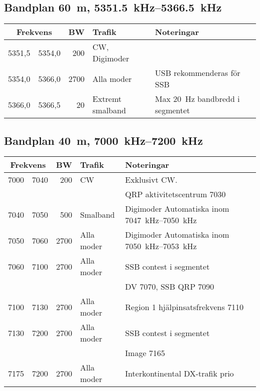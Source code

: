 \subsection{Bandplan \qty{60}{\metre}, \SIrange{5351,5}{5366,5}{\kilo\hertz}}
\begin{tabular}{rrrll}
    \multicolumn{2}{c}{\textbf{Frekvens}} & \textbf{BW} & \textbf{Trafik} & \textbf{Noteringar} \\ \hline

    5351,5 & 5354,0 & 200 & CW, Digimoder & \\ \hline
    5354,0 & 5366,0 & 2700 & Alla moder & USB rekommenderas för SSB  \\ \hline
    5366,0 & 5366,5 & 20 & Extremt smalband & Max \qty{20}{\hertz} bandbredd i segmentet \\
\end{tabular}

\subsection{Bandplan \qty{40}{\metre}, \SIrange{7000}{7200}{\kilo\hertz}}
\begin{tabular}{rrrll}
\multicolumn{2}{c}{\textbf{Frekvens}} & \textbf{BW} & \textbf{Trafik} & \textbf{Noteringar} \\ \hline

7000 & 7040 & 200  & CW         & Exklusivt CW.                                        \\
     &      &      &            & QRP aktivitetscentrum \num{7030}                    \\ \hline
7040 & 7050 & 500  & Smalband   & Digimoder Automatiska inom \SIrange{7047}{7050}{\kilo\hertz} \\ \hline
7050 & 7060 & 2700 & Alla moder & Digimoder Automatiska inom \SIrange{7050}{7053}{\kilo\hertz} \\ \hline
7060 & 7100 & 2700 & Alla moder & SSB contest i segmentet                              \\
     &      &      &            & DV \num{7070}, SSB QRP \num{7090}                    \\ \hline
7100 & 7130 & 2700 & Alla moder & Region 1 hjälpinsatsfrekvens \num{7110}           \\ \hline
7130 & 7200 & 2700 & Alla moder & SSB contest i segmentet                              \\
     &      &      &            & Image \num{7165}                                     \\ \hline
7175 & 7200 & 2700 & Alla moder & Interkontinental DX-trafik prio                      \\
\end{tabular}

